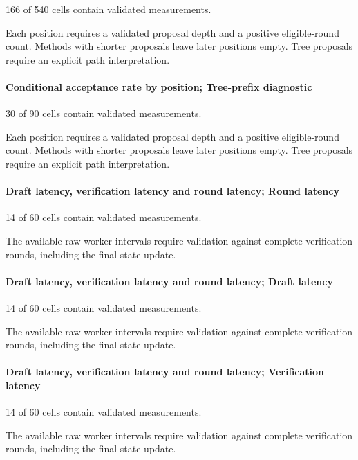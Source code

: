 \documentclass[conference,onecolumn]{IEEEtran}
\begin{document}
166 of 540 cells contain validated measurements.

Each position requires a validated proposal depth and a positive eligible-round count. Methods with shorter proposals leave later positions empty. Tree proposals require an explicit path interpretation.

\paragraph*{Conditional acceptance rate by position; Tree-prefix diagnostic}

30 of 90 cells contain validated measurements.

Each position requires a validated proposal depth and a positive eligible-round count. Methods with shorter proposals leave later positions empty. Tree proposals require an explicit path interpretation.

\paragraph*{Draft latency, verification latency and round latency; Round latency}

14 of 60 cells contain validated measurements.

The available raw worker intervals require validation against complete verification rounds, including the final state update.

\paragraph*{Draft latency, verification latency and round latency; Draft latency}

14 of 60 cells contain validated measurements.

The available raw worker intervals require validation against complete verification rounds, including the final state update.

\paragraph*{Draft latency, verification latency and round latency; Verification latency}

14 of 60 cells contain validated measurements.

The available raw worker intervals require validation against complete verification rounds, including the final state update.
\end{document}
